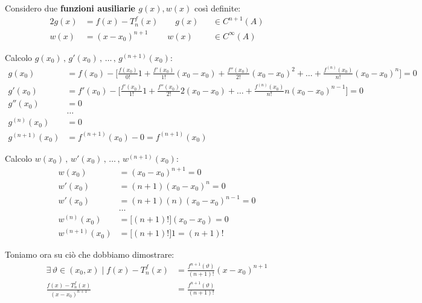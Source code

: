 \documentclass[../../dimostrazioni]{subfiles}
\begin{document}
            \medskip

            Considero due \textbf{funzioni ausiliarie \(g(x), w(x)\)} così definite:
            \begin{alignat*}{2}
                g(x) &= f(x) - T_n^f (x) \qquad g(x) &&\in C^{n+1} (A)\\
                w(x) &= (x - x_0)^{n+1} \qquad \; w(x) &&\in C^{\infty} (A)
            \end{alignat*}

            \newpage

            Calcolo \( g(x_0)\, , \, g'(x_0)\, ,\, \dots\, , \, g ^{(n+1)}(x_0)  \):
            \begin{align*}
                g(x_0) &= f(x_0) - \bigg[\frac{f(x_0)}{0!}1 + \frac{f'(x_0)}{1!}(x_0-x_0) + \frac{f''(x_0)}{2!}(x_0-x_0)^2 + \dots + \frac{f^{(n)}(x_0)}{n!}(x_0-x_0)^n \bigg] = 0\\
                g'(x_0) &= f'(x_0) - \bigg[\frac{f'(x_0)}{1!}1 + \frac{f''(x_0)}{2!}2(x_0-x_0) + \dots + \frac{f^{(n)}(x_0)}{n!}n(x_0-x_0)^{n-1} \bigg] = 0\\
                g''(x_0) &= 0\\
                &\dots\\
                g^{(n)} (x_0) &= 0\\
                g^{(n+1)} (x_0) &= f^{(n+1)}(x_0) - 0 = f^{(n+1)}(x_0)
            \end{align*}

            \bigskip
            
            Calcolo \( w(x_0)\, , \, w'(x_0)\, ,\, \dots\, , \, w ^{(n+1)}(x_0)  \):
            \begin{align*}
                w(x_0) &= (x_0 - x_0)^{n+1} = 0\\
                w'(x_0) &= (n+1)(x_0 - x_0)^{n} = 0\\
                w'(x_0) &= (n+1)(n)(x_0 - x_0)^{n-1} = 0\\
                & \dots\\
                w^{(n)} (x_0) &= \big[(n+1)!\big](x_0 - x_0) = 0\\
                w^{(n+1)} (x_0) &= \big[(n+1)!\big] 1 = (n+1)!
            \end{align*}

            \bigskip

            Toniamo ora su ciò che dobbiamo dimostrare:
            \begin{align*}
                \exists \, \vartheta \in (x_0, x) \; | \; f(x) - T _n ^ f (x) &= \frac{f^{n+1}(\vartheta)}{(n+1)!}(x-x_0)^{n+1}\\
                \frac{f(x) - T _n ^ f (x)}{(x-x_0)^{n+1}} &= \frac{f^{n+1}(\vartheta)}{(n+1)!}
            \end{align*}
\end{document}
